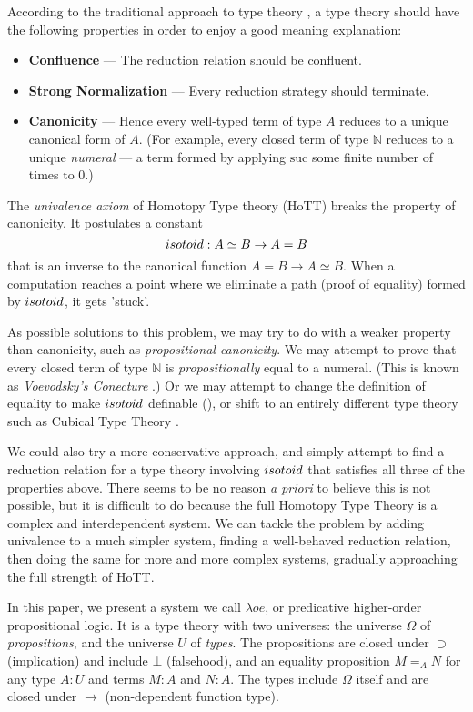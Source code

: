 According to the traditional approach to type theory , a type theory should have the
following properties in order to enjoy a good meaning explanation:
\begin{itemize}
\item \textbf{Confluence} --- The reduction relation should be confluent.
\item \textbf{Strong Normalization} --- Every reduction strategy should terminate.
\item \textbf{Canonicity} --- Hence every well-typed term of type $A$ reduces to a unique canonical form of $A$.  (For example,
every closed term of type $\mathbb{N}$ reduces to a unique \emph{numeral} --- a term formed by applying $\mathrm{suc}$ some
finite number of times to 0.)
\end{itemize}

The \emph{univalence axiom} of Homotopy Type theory (HoTT)  breaks the property of canonicity.  It postulates a
constant
\[ isotoid : A \simeq B \rightarrow A = B \]
that is an inverse to the canonical function $A = B \rightarrow A \simeq B$.  When a computation reaches a point
where we eliminate a path (proof of equality) formed by $isotoid$, it gets 'stuck'.

As possible solutions to this problem, we may try to do with a weaker property than canonicity, such as \emph{propositional canonicity}.
We may attempt to prove that every closed term of type $\mathbb{N}$ is \emph{propositionally} equal to a numeral.  (This is known as
\emph{Voevodsky's Conecture} .)  Or we may attempt to change the definition of equality to make $isotoid$ definable (\cite{Polonsky14a}), or
shift to an entirely different type theory such as Cubical Type Theory .

We could also try a more conservative approach, and simply attempt to find a reduction relation for a type theory involving $isotoid$ that satisfies
all three of the properties above.  There seems to be no reason \emph{a priori} to believe this is not possible, but it is difficult to do because
the full Homotopy Type Theory is a complex and interdependent system.  We can tackle the problem by adding univalence to a much simpler system, finding
a well-behaved reduction relation, then doing the same for more and more complex systems, gradually approaching the full strength of HoTT.

In this paper, we present a system we call $\lambda o e$, or predicative higher-order propositional logic.  It is a type theory with two universes: the universe $\Omega$
of \emph{propositions}, and the universe $U$ of \emph{types}.  The propositions are closed under $\supset$ (implication) and include $\bot$ (falsehood), and an equality proposition $M =_A N$ for
any type $A : U$ and terms $M : A$ and $N : A$.  The types include $\Omega$ itself and are closed under $\rightarrow$ (non-dependent function type).

